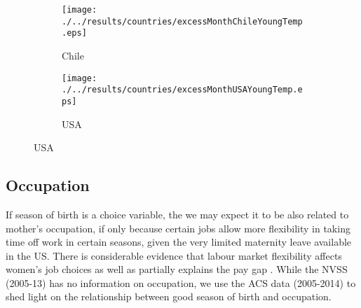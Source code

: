 \documentclass[a4paper, 12 pt]{article}
\theoremstyle{plain}
\begin{document}
\begin{doublespace}
\begin{figure}[htpb!]
\begin{center}
\caption{Births per Month and Temperature: Various Countries}
\label{bqFig:excessTemp}
\begin{subfigure}{.5\textwidth}
  \centering
  \texttt{[image: ./../results/countries/excessMonthChileYoungTemp.eps]}
  \caption{Chile}
  \label{fig:ChileTemp}
\end{subfigure}%
\begin{subfigure}{.5\textwidth}
  \centering
  \texttt{[image: ./../results/countries/excessMonthUSAYoungTemp.eps]}
  \caption{USA}
  \label{fig:USATemp}
\end{subfigure}
\end{center}
\end{figure}


\newpage
\subsection{Occupation}
If season of birth is a choice variable, the we may expect it to be also related to mother's occupation, if only because certain jobs allow more flexibility in taking time off work in certain seasons, given the very limited maternity leave available in the US. There is considerable evidence that labour market flexibility affects women's job choices as well as partially explains the pay gap \citep{Goldin2014}. While the NVSS (2005-13) has no information on occupation, we use the ACS data (2005-2014) to shed light on the relationship between good season of birth and occupation.


\end{doublespace}
\end{document}
